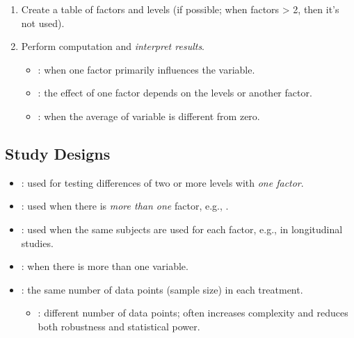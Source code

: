 \begin{itemize}
\begin{enumerate}
\begin{itemize}
        \end{itemize}
      \item Create a table of factors and levels (if possible; when factors > 2, then it's not used).
      \item Perform computation and \emph{interpret results}.
        \begin{itemize}
          \item {}: when one factor primarily influences the  variable.
          \item {}: the effect of one factor depends on the levels or another factor.
          \item {}: when the average of  variable is different from zero.
        \end{itemize}
    \end{enumerate}

  \subsection{Study Designs}
  \begin{itemize}
    \item {}: used for testing differences of two or more levels with \emph{one factor}.
    \item {}: used when there is \emph{more than one} factor, e.g., \hyperref[Subsection: Two-Way ANOVA]{}.
    \item {}: used when the same subjects are used for each factor, e.g., in longitudinal studies.
    \item {}: when there is more than one  variable.
    \item {}: the same number of data points (sample size) in each treatment.
      \begin{itemize}
        \item {}: different number of data points; often increases complexity and reduces both robustness and statistical power. 
      \end{itemize}
  \end{itemize}
    

\end{itemize}
